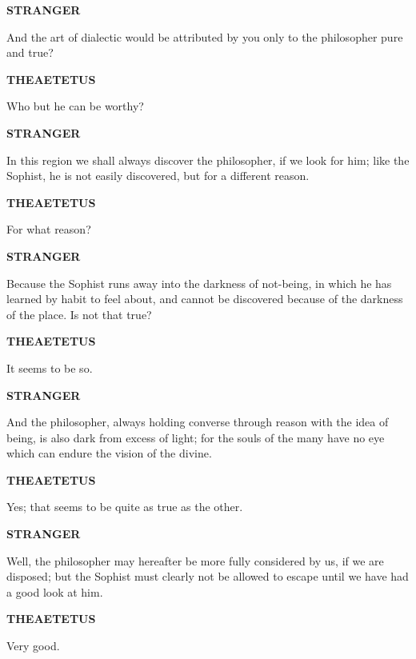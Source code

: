 \documentclass[11pt,letter]{article}
\begin{document}
\par \textbf{STRANGER}
\par   And the art of dialectic would be attributed by you only to the philosopher pure and true?

\par \textbf{THEAETETUS}
\par   Who but he can be worthy?

\par \textbf{STRANGER}
\par   In this region we shall always discover the philosopher, if we look for him; like the Sophist, he is not easily discovered, but for a different reason.

\par \textbf{THEAETETUS}
\par   For what reason?

\par \textbf{STRANGER}
\par   Because the Sophist runs away into the darkness of not-being, in which he has learned by habit to feel about, and cannot be discovered because of the darkness of the place. Is not that true?

\par \textbf{THEAETETUS}
\par   It seems to be so.

\par \textbf{STRANGER}
\par   And the philosopher, always holding converse through reason with the idea of being, is also dark from excess of light; for the souls of the many have no eye which can endure the vision of the divine.

\par \textbf{THEAETETUS}
\par   Yes; that seems to be quite as true as the other.

\par \textbf{STRANGER}
\par   Well, the philosopher may hereafter be more fully considered by us, if we are disposed; but the Sophist must clearly not be allowed to escape until we have had a good look at him.

\par \textbf{THEAETETUS}
\par   Very good.
\end{document}
